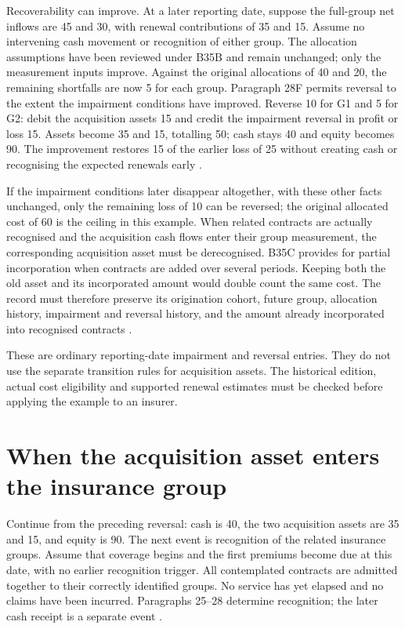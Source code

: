 Recoverability can improve. At a later reporting date, suppose the full-group
net inflows are 45 and 30, with renewal contributions of 35 and 15. Assume no
intervening cash movement or recognition of either group. The allocation
assumptions have been reviewed under B35B and remain unchanged; only the
measurement inputs improve. Against the original allocations of 40 and 20,
the remaining shortfalls are now 5 for each group. Paragraph 28F permits
reversal to the extent the impairment conditions have improved. Reverse 10
for G1 and 5 for G2: debit the acquisition assets 15 and credit the impairment
reversal in profit or loss 15. Assets become 35 and 15, totalling 50; cash
stays 40 and equity becomes 90. The improvement restores 15 of the earlier
loss of 25 without creating cash or recognising the expected renewals early
\citep[paragraphs 28F and B35B]{aasb17}.

If the impairment conditions later disappear altogether, with these other
facts unchanged, only the remaining loss of 10 can be reversed; the original
allocated cost of 60 is the ceiling in this example. When related contracts
are actually recognised and the acquisition cash flows enter their group
measurement, the corresponding acquisition asset must be derecognised.
B35C provides for partial incorporation when contracts are added over several
periods. Keeping both the old asset and its incorporated amount would double
count the same cost. The record must therefore preserve its origination cohort,
future group, allocation history, impairment and reversal history, and the
amount already incorporated into recognised contracts
\citep[paragraphs 28C--28F and B35B--B35C]{aasb17}.

These are ordinary reporting-date impairment and reversal entries. They do
not use the separate transition rules for acquisition assets. The historical
edition, actual cost eligibility and supported renewal estimates must be
checked before applying the example to an insurer.

\clearpage
\section{When the acquisition asset enters the insurance group}
\label{sec:insurance-acquisition-incorporation}

Continue from the preceding reversal: cash is 40, the two acquisition assets
are 35 and 15, and equity is 90. The next event is recognition of the related
insurance groups. Assume that coverage begins and the first premiums become
due at this date, with no earlier recognition trigger. All contemplated
contracts are admitted together to their correctly identified groups. No
service has yet elapsed and no claims have been incurred. Paragraphs 25--28
determine recognition; the later cash receipt is a separate event
\citep[paragraphs 25--28]{aasb17}.


